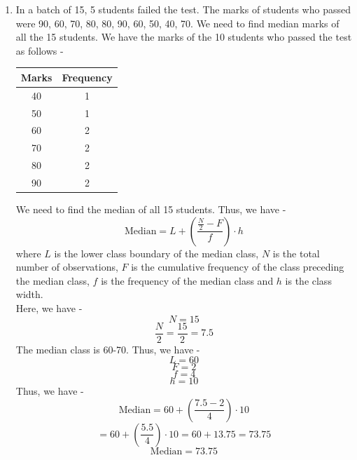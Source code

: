 \begin{enumerate}
\begin{proof}
    Let us denote $\ln a + \ln \frac{1 + r}{2}$ by $A$ and $\ln r$ by $k$. Thus, we have -
    \[\ln G = A + \frac{k}{N} \sum_{i=1}^{r} (i-1) f_i\]
    \[\boxed{= A + \frac{k}{n} \sum_{i=1}^{r} (i-1)f_i
    }\]
    \end{proof}
    \item In a batch of 15, 5 students failed the test. The marks of students who passed were 90, 60, 70, 80, 80, 90, 60, 50, 40, 70. We need to find median marks of all the 15 students.
    We have the marks of the 10 students who passed the test as follows -
    \begin{center}
        \begin{tabular}{|c|c|}
            \hline
            Marks & Frequency \\
            \hline
            40 & 1 \\
            50 & 1 \\
            60 & 2 \\
            70 & 2 \\
            80 & 2 \\
            90 & 2 \\
            \hline
        \end{tabular}
    \end{center}
    We need to find the median of all 15 students. Thus, we have -
    \[ \text{Median} = L + \left(\frac{\frac{N}{2} - F}{f}\right) \cdot h\]
    where $L$ is the lower class boundary of the median class, $N$ is the total number of observations, $F$ is the cumulative frequency of the class preceding the median class, $f$ is the frequency of the median class and $h$ is the class width. \\
    Here, we have -
    \[N = 15\]
    \[\frac{N}{2} = \frac{15}{2} = 7.5\]
    The median class is 60-70. Thus, we have -
    \[L = 60\]
    \[F = 2\]
    \[f = 4\]
    \[h = 10\]
    Thus, we have -
    \[ \text{Median} = 60 + \left(\frac{7.5 - 2}{4}\right) \cdot 10\]
    \[= 60 + \left(\frac{5.5}{4}\right) \cdot 10 = 60 + 13.75 = 73.75\]
    \[\boxed{\text{Median} = 73.75
    }\]
\end{enumerate}
